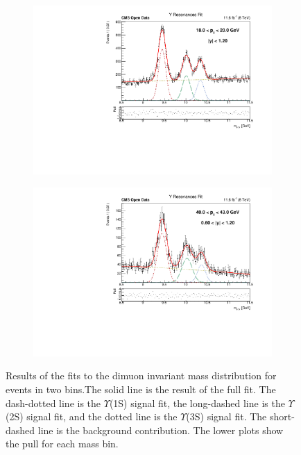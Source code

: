 \documentclass[a4paper,11pt]{article}
\begin{document}
\begin{figure}[h]
    \centering
    \begin{subfigure}{.49\textwidth}
    \centering
    \includegraphics[width=\textwidth]{YResonances_3.pdf}
    \end{subfigure}
    \begin{subfigure}{.49\textwidth}
  \centering
    \includegraphics[width=\textwidth]{YResonancesFit.pdf}
    \end{subfigure}
    \caption{Results of the fits to the dimuon invariant mass distribution for events in two bins.The solid line is the result of the full fit. The dash-dotted line is the $\Upsilon$(1S) signal fit, the long-dashed line is the $\Upsilon$(2S) signal fit, and the dotted line is the $\Upsilon$(3S) signal fit. The short-dashed line is the background contribution. The lower plots show the pull for each mass bin.}
    \label{fig:fit}
\end{figure}%
\end{document}
